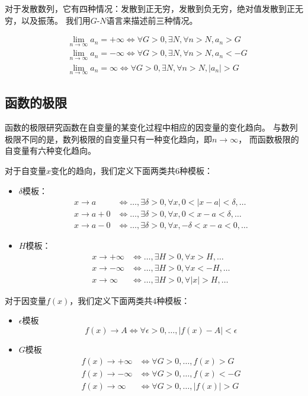 对于发散数列，它有四种情况：发散到正无穷，发散到负无穷，绝对值发散到正无穷，以及振荡。
我们用$G$-$N$语言来描述前三种情况。
\begin{definition}
  \begin{align*}
    &\lim_{n\to\infty}a_n=+\infty
    \iff \forall G>0,\exists N,\forall n>N, a_n > G \\
    &\lim_{n\to\infty}a_n=-\infty
    \iff \forall G>0,\exists N,\forall n>N, a_n < -G \\
    &\lim_{n\to\infty}a_n=\infty
    \iff \forall G>0,\exists N,\forall n>N, |a_n| > G
  \end{align*}
\end{definition}

\subsection{函数的极限}
函数的极限研究函数在自变量的某变化过程中相应的因变量的变化趋向。
与数列极限不同的是，数列极限的自变量只有一种变化趋向，即$n\to\infty$，
而函数极限的自变量有六种变化趋向。

对于自变量$x$变化的趋向，我们定义下面两类共6种模板：
\begin{itemize}
  \item $\delta$模板：
  \begin{align*}
    x\to a
    &\iff \dots, \exists \delta > 0,\forall x, 0<|x-a|<\delta, \dots \\
    x\to a+0
    &\iff \dots, \exists \delta > 0,\forall x, 0<x-a<\delta, \dots \\
    x\to a-0
    &\iff \dots, \exists \delta > 0,\forall x, -\delta<x-a<0, \dots
  \end{align*}
    \item $H$模板：
  \begin{align*}
    x\to+\infty
    &\iff \dots, \exists H > 0, \forall x > H, \dots \\
    x\to-\infty
    &\iff \dots, \exists H > 0, \forall x < -H, \dots \\
    x\to\infty
    &\iff \dots, \exists H > 0, \forall |x| > H, \dots
  \end{align*}
\end{itemize}

对于因变量$f(x)$，我们定义下面两类共4种模板：
\begin{itemize}
  \item $\epsilon$模板
  \begin{displaymath}
    f(x)\to A
    \iff \forall\epsilon>0, \dots, |f(x)-A|<\epsilon
  \end{displaymath}
  \item $G$模板
  \begin{align*}
    f(x)\to+\infty
    &\iff \forall G>0,\dots, f(x) > G \\
    f(x)\to-\infty
    &\iff \forall G>0,\dots, f(x) < -G \\
    f(x)\to\infty
    &\iff \forall G>0,\dots, |f(x)| > G
  \end{align*}
\end{itemize}

